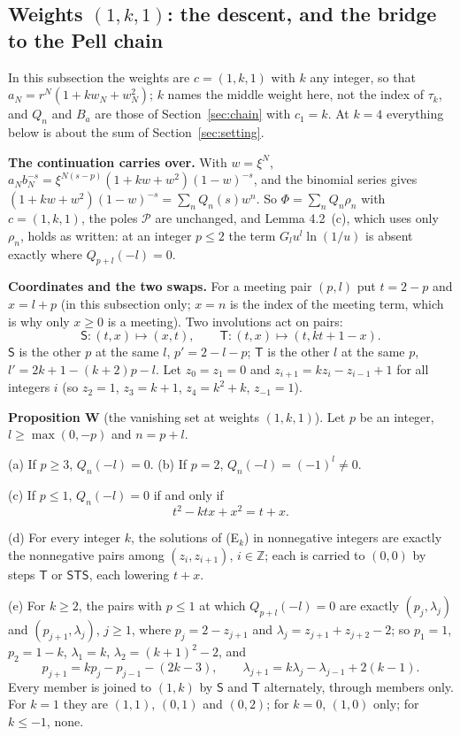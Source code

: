\documentclass[11pt]{article}
\begin{document}
\subsection{\texorpdfstring{Weights $(1,k,1)$}{Weights (1, k, 1)}: the descent, and the bridge to the Pell chain}\label{sec:family}

In this subsection the weights are $c=(1,k,1)$ with $k$ any integer, so that $a_N=r^N(1+kw_N+w_N^2)$; $k$ names the middle weight here, not the index of $\tau_k$, and $Q_n$ and $B_a$ are those of Section~\ref{sec:chain} with $c_1=k$. At $k=4$ everything below is about the sum of Section~\ref{sec:setting}.

\medskip
\noindent\textbf{The continuation carries over.} With $w=\xi^N$, $a_Nb_N^{-s}=\xi^{N(s-p)}(1+kw+w^2)(1-w)^{-s}$, and the binomial series gives $(1+kw+w^2)(1-w)^{-s}=\sum_nQ_n(s)w^n$. So $\Phi=\sum_nQ_n\rho_n$ with $c=(1,k,1)$, the poles $\mathcal{P}$ are unchanged, and Lemma 4.2~(c), which uses only $\rho_n$, holds as written: at an integer $p\le2$ the term $G_lu^l\ln(1/u)$ is absent exactly where $Q_{p+l}(-l)=0$.

\medskip
\noindent\textbf{Coordinates and the two swaps.} For a meeting pair $(p,l)$ put $t=2-p$ and $x=l+p$ (in this subsection only; $x=n$ is the index of the meeting term, which is why only $x\ge0$ is a meeting). Two involutions act on pairs:
\[
\mathsf{S}:(t,x)\mapsto(x,t),\qquad \mathsf{T}:(t,x)\mapsto(t,kt+1-x).
\]
$\mathsf{S}$ is the other $p$ at the same $l$, $p'=2-l-p$; $\mathsf{T}$ is the other $l$ at the same $p$, $l'=2k+1-(k+2)p-l$.
Let $z_0=z_1=0$ and $z_{i+1}=kz_i-z_{i-1}+1$ for all integers $i$ (so $z_2=1$, $z_3=k+1$, $z_4=k^2+k$, $z_{-1}=1$).

\medskip
\noindent\textbf{Proposition W} (the vanishing set at weights $(1,k,1)$). Let $p$ be an integer, $l\ge\max(0,-p)$ and $n=p+l$.

(a) If $p\ge3$, $Q_n(-l)=0$. (b) If $p=2$, $Q_n(-l)=(-1)^l\ne0$.

(c) If $p\le1$, $Q_n(-l)=0$ if and only if
\[
t^2-ktx+x^2=t+x.\tag{E$_k$}
\]

(d) For every integer $k$, the solutions of (E$_k$) in nonnegative integers are exactly the nonnegative pairs among $(z_i,z_{i+1})$, $i\in\mathbb{Z}$; each is carried to $(0,0)$ by steps $\mathsf{T}$ or $\mathsf{S}\mathsf{T}\mathsf{S}$, each lowering $t+x$.

(e) For $k\ge2$, the pairs with $p\le1$ at which $Q_{p+l}(-l)=0$ are exactly $(p_j,\lambda_j)$ and $(p_{j+1},\lambda_j)$, $j\ge1$, where $p_j=2-z_{j+1}$ and $\lambda_j=z_{j+1}+z_{j+2}-2$; so $p_1=1$, $p_2=1-k$, $\lambda_1=k$, $\lambda_2=(k+1)^2-2$, and
\[
p_{j+1}=kp_j-p_{j-1}-(2k-3),\qquad \lambda_{j+1}=k\lambda_j-\lambda_{j-1}+2(k-1).
\]
Every member is joined to $(1,k)$ by $\mathsf{S}$ and $\mathsf{T}$ alternately, through members only. For $k=1$ they are $(1,1)$, $(0,1)$ and $(0,2)$; for $k=0$, $(1,0)$ only; for $k\le-1$, none.
\end{document}
